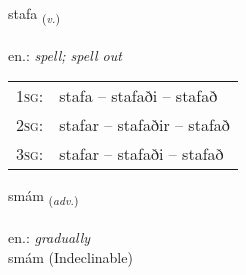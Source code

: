 \documentclass[frontgrid, backgrid]{flacards}\usepackage[]{graphicx}\usepackage[]{xcolor}
\begin{document}
\renewcommand{\flhead}{\vskip5pt \fboxsep=0pt {\small\bfseries\footnotesize Sagnorð | Verb}}
\renewcommand{\fcfoot}{\vskip5pt \fboxsep=0pt \hspace{2pt}{\small\bfseries\footnotesize 2K}}

\renewcommand{\blhead}{\vskip5pt {\small\bfseries\footnotesize Sagnorð | Verb }}
\renewcommand{\bcfoot}{\vskip5pt \hspace{2pt}{\small\bfseries\footnotesize 2K}}


{stafa \small{\textsubscript{(\textit{v.})}} \\[1ex] %
\textphonetic{[staːva]} \\
en.: \emph{spell; spell out} \\  [2ex]
\renewcommand*{\arraystretch}{0.8}
\begin{tabular}{p{1cm}l}
\textsc{1sg}: & stafa -- stafaði -- stafað \\ 
\textsc{2sg}: & stafar -- stafaðir -- stafað \\ 
\textsc{3sg}: & stafar -- stafaði -- stafað \\ 
\end{tabular}
}


\renewcommand{\flhead}{\vskip5pt \fboxsep=0pt {\small\bfseries\footnotesize Atviksorð | Adverb}}
\renewcommand{\fcfoot}{\vskip5pt \fboxsep=0pt \hspace{2pt}{\small\bfseries\footnotesize 2K}}

\renewcommand{\blhead}{\vskip5pt {\small\bfseries\footnotesize Atviksorð | Adverb }}
\renewcommand{\bcfoot}{\vskip5pt \hspace{2pt}{\small\bfseries\footnotesize 2K}}


{smám \small{\textsubscript{(\textit{adv.})}} \\[1ex]
\textphonetic{[smauːm]} \\
en.: \emph{gradually} \\  [2ex]
smám (Indeclinable)}
\end{document}

